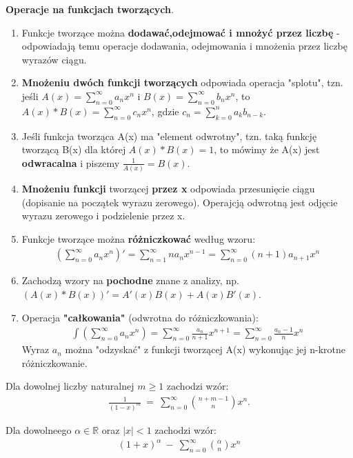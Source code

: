 \documentclass[12pt]{article}
\begin{document}
    \begin{theorem}
        \textbf{Operacje na funkcjach tworzących}.
        \begin{enumerate}
            \item Funkcje tworzące można \textbf{dodawać,odejmować i mnożyć przez liczbę} - odpowiadają temu operacje
            dodawania, odejmowania i mnożenia przez liczbę wyrazów ciągu.
            \item \textbf{Mnożeniu dwóch funkcji tworzących} odpowiada operacja "splotu", tzn. jeśli
            $A(x) =  \sum_{n=0}^{\infty} a_n x^n$ i $B(x) = \sum_{n=0}^{\infty} b_n x^n$, to
            $A(x) * B(x) = \sum_{n=0}^{\infty} c_n x^n$, gdzie $c_n = \sum_{k=0}^n a_k b_{n-k}$.
            \item Jeśli funkcja tworząca A(x) ma "element odwrotny", tzn. taką funkcję tworzącą B(x) dla której
            $A(x) * B(x) = 1$, to mówimy że A(x) jest \textbf{odwracalna} i piszemy $\frac{1}{A(x)} = B(x)$.
            \item \textbf{Mnożeniu funkcji} tworzącej \textbf{przez x} odpowiada przesunięcie ciągu (dopisanie na początek
            wyrazu zerowego). Operajcją odwrotną jest odjęcie wyrazu zerowego i podzielenie przez x.
            \item Funkcje tworzące można \textbf{różniczkować} według wzoru:
            \begin{align*}
                (\sum_{n=0}^{\infty} a_n x^n)' = \sum_{n=1}^{\infty} n a_n x^{n-1} = \sum_{n=0}^{\infty} (n+1) a_{n+1} x^n
            \end{align*}
            \item Zachodzą wzory na \textbf{pochodne} znane z analizy, np. $(A(x) * B(x))' = A'(x)B(x) + A(x)B'(x)$.
            \item Operacja \textbf{"całkowania"} (odwrotna do różniczkowania):
            \begin{align*}
                \int (\sum_{n=0}^{\infty} a_n x^n) = \sum_{n=0}^{\infty} \frac{a_n}{n+1} x^{n+1} = \sum_{n=0}^{\infty} \frac{a_n - 1}{n} x^n
            \end{align*}
            Wyraz $a_n$ można "odzyskać" z funkcji tworzącej A(x) wykonując jej n-krotne różniczkowanie.
        \end{enumerate}
    \end{theorem}

    \begin{theorem}
        Dla dowolnej liczby naturalnej $m \geq 1$ zachodzi wzór:
        \begin{align*}
            \frac{1}{(1-x)^m} ~ = ~ \sum_{n=0}^{\infty} \binom{n+m-1}{n} x^n.
        \end{align*}

        Dla dowolneego $\alpha \in \mathbb{R}$ oraz $|x| < 1$ zachodzi wzór:
        \begin{align*}
            (1+x)^{\alpha} ~ - ~ \sum_{n=0}^{\infty} \binom{\alpha}{n} x^n
        \end{align*}
    \end{theorem}
\end{document}
